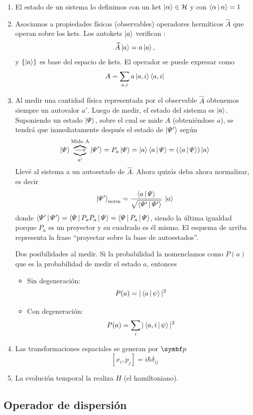 \documentclass[10pt,oneside]{CBFT_book}
\begin{document}
\begin{enumerate}
	\item El estado de un sistema lo definimos con un ket $\Ket{\alpha} \in \mathcal{H}$ y
		con $\Braket{\alpha|\alpha}=1$
	\item Asociamos a propiedades físicas (observables) operadores hermíticos $\widehat{A}$ 
		que operan sobre los kets. Los autokets $\Ket{a}$ verifican :
	\[
		\widehat{A}\Ket{a} = a \Ket{a}, 
	\]
	y $\{ \Ket{a} \}$ es base del espacio de kets. El operador se puede expresar como
	\[
		A = \sum_{a,i} a \Ket{a,i}\Bra{a,i}
	\]
	\item Al medir una cantidad física representada por el observable $\widehat{A}$ obtenemos
	siempre un autovalor $a'$.
	Luego de medir, el estado del sistema es $\Ket{a}$.
	Suponiendo un estado $\Ket{\Psi}$, sobre el cual se mide $A$ (obteniéndose $a$), se tendrá que
	inmediatamente después el estado de $\Ket{\Psi'}$ según
	\[
		\Ket{\Psi} \overbrace{\underbrace{\longrightarrow}_{a'}}^{\text{Mido A}} \Ket{\Psi'} =
		P_a \Ket{\Psi} = \Ket{a}\Braket{a|\Psi} =(\Braket{a|\Psi})\Ket{a}
	\]
	Llevé al sistema a un autoestado de $\widehat{A}$. 
	Ahora quizás deba ahora normalizar, es decir
	\[
		\Ket{\Psi'}_\text{norm} = \frac{\Braket{a|\Psi}}{\sqrt{\Braket{\Psi'|\Psi'}}} \: \Ket{a}
	\]
	donde $\Braket{\Psi'|\Psi'}=\Braket{\Psi|P_a P_a|\Psi} = \Braket{\Psi|P_a|\Psi}$, siendo la
	última igualdad porque $P_a$ es un proyector y su cuadrado es él mismo.
	El esquema de arriba representa la frase ``proyectar sobre la base de autoestados''.
	
	Dos posibilidades al medir. Si la probabilidad la nomenclamos como $P(a)$ que es la probabilidad
	de medir el estado $a$, entonces
	\begin{itemize}
	 \item Sin degeneración:
	 \[
		P(a) = |\Braket{a|\psi}|^2
	 \]
	 \item Con degeneración:
	 \[
		P(a) = \sum_{i} |\Braket{a,i|\psi}|^2
	 \]
	\end{itemize}
	\item Las transformaciones espaciales se generan por $\vb{p}$
	\[	
		[x_i,p_j] = i\hbar\delta_{ij}
	\]
	\item La evolución temporal la realiza $H$ (el hamiltoniano).
\end{enumerate}


\subsection{Operador de dispersión}
\end{document}
